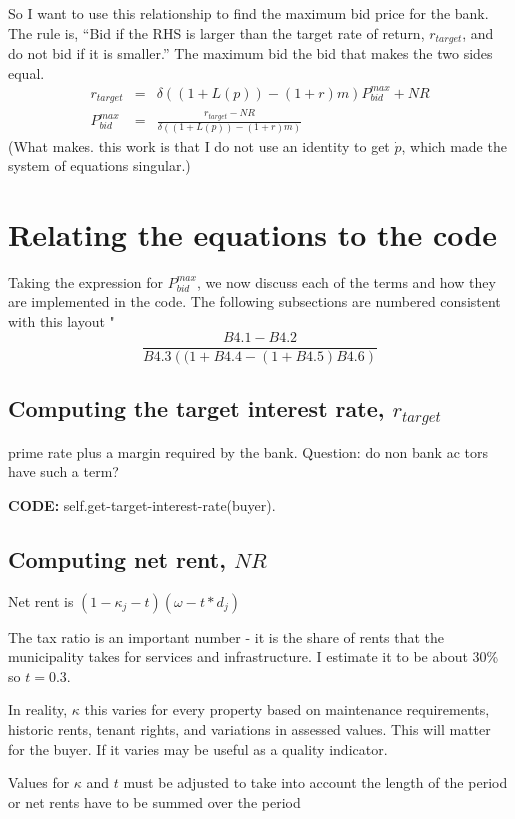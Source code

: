 So I want to use this relationship to find the maximum bid price for the bank. The rule is, ``Bid if the RHS is larger than the target rate of return, $r_{target}$, and do not bid if it is smaller.''  The maximum bid the bid that makes the two sides equal. 
\begin{eqnarray}
r_{target}&=& \delta\left( (1+L(p)) - (1+r)m \right) P^{max}_{bid} + NR  \nonumber\\
   P^{max}_{bid} &=&\frac{r_{target}-NR}{\delta\left( (1+L(p)) - (1+r)m \right)}  
\end{eqnarray}
(What makes. this work is that I do not use an identity to get
$\dot p$, which made the system of equations singular.)
\newpage
\section{Relating the equations to the code}
Taking the expression for $P^{max}_{bid}$, we now discuss each of the terms and how they are implemented in the code. The following subsections are numbered consistent with this layout "
\[\frac{B4.1-B4.2}{B4.3\left( (1+B4.4 - (1+B4.5)B4.6\right)}\]

\subsection{Computing the target interest rate, $r_{target}$}
prime rate plus a margin required by the bank.  Question: do non bank ac tors have such a term?

\textbf{CODE:}   self.get-target-interest-rate(buyer).


\subsection{Computing net rent, $NR$}
Net rent is $(1-\kappa_j - t) (\omega-t*d_j)$


The tax ratio is an important number - it is the share of rents that the municipality takes for services and infrastructure. I estimate it to be about 30\% so $t=0.3$.


In reality, $\kappa$ this varies for every property based on maintenance requirements, historic rents, tenant rights, and variations in assessed values. This will matter for the buyer. If it varies may be useful as a quality indicator.

Values for $\kappa$ and $t$ must be adjusted to take into account the length of the period or net rents have to be summed over the period


